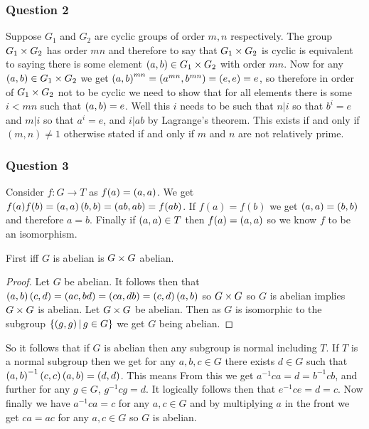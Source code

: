 \documentclass{article}
\begin{document}
\subsubsection{Question 2}
Suppose $G_1$ and $G_2$ are cyclic groups of order $m,n$ respectively. The group $G_1\times G_2$ has order $mn$ and therefore to say that $G_1\times G_2$ is cyclic is equivalent to saying there is some element $\left( {a} , {b} \right) \in G_1\times G_2$ with order $mn$. Now for any $\left( {a} , {b} \right)\in G_1\times G_2$ we get $\left( {a} , {b} \right)^{mn} = \left( {a^{mn}} , {b^{mn}} \right) = \left( {e} , {e} \right) = e$, so therefore in order of $G_1\times G_2$ not to be cyclic we need to show that for all elements there is some $i < mn$ such that $\left( {a} , {b} \right) = e$. Well this $i$ needs to be such that $n|i$ so that $b^i = e$ and $m|i$ so that $a^i = e$, and $i | ab$ by Lagrange's theorem. This exists if and only if $(m,n) \not = 1$ otherwise stated if and only if $m$ and $n$ are not relatively prime.

\subsubsection{Question 3}

Consider $f:G\to T$ as $f(a) = \left( {a} , {a} \right)$. We get $f(a)f(b) = \left( {a} , {a} \right)\left( {b} , {b} \right) = \left( {ab} , {ab} \right) = f(ab)$. If $f(a) = f(b)$ we get $\left( {a} , {a} \right) = \left( {b} , {b} \right) $and therefore $a=b$. Finally if $\left( {a} , {a} \right) \in T$ then $f(a) = \left( {a} , {a} \right)$ so we know $f$ to be an isomorphism.

 First iff $G$ is abelian is $G\times G$ abelian.
\begin{proof}
	Let $G$ be abelian. It follows then that $\left( {a} , {b} \right)\left( {c} , {d} \right) = \left( {ac} , {bd} \right) = \left( {ca} , {db} \right) = \left( {c} , {d} \right)\left( {a} , {b} \right)$ so $G\times G$ so $G$ is abelian implies $G\times G$ is abelian. Let $G\times G$ be abelian. Then as $G$ is isomorphic to the subgroup $\left\{{\left( {g} , {g} \right)} \,\middle|\, {g \in G}\right\}$ we get $G$ being abelian.
\end{proof}

So it follows that if $G$ is abelian then any subgroup is normal including $T$. If $T$ is a normal subgroup then we get for any $a,b,c \in G$ there exists $d\in G$ such that $\left( {a} , {b} \right)^{-1}\left( {c} , {c} \right)\left( {a} , {b} \right) = \left( {d} , {d} \right)$. This means  From this we get $a^{-1}ca = d = b^{-1}cb$, and further for any $g\in G$, $g^{-1}cg = d$. It logically follows then that $e^{-1}ce = d = c$. Now finally we have $a^{-1}ca = c$ for any $a,c\in G$ and by multiplying $a$ in the front we get $ca = ac$ for any $a,c\in G$ so $G$ is abelian.


\end{document}
